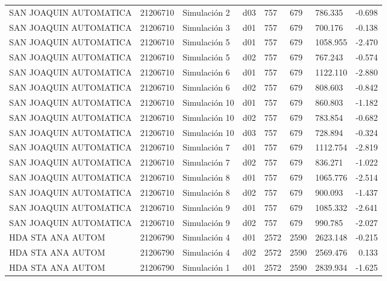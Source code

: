 \begin{landscape}
\begin{longtable}{lrlp{2cm}p{2cm}p{3cm}p{2cm}r}
  SAN JOAQUIN AUTOMATICA &  21206710 &   Simulación 2 &   d03 &       757 &      679 &   786.335 &    -0.698 \\
  SAN JOAQUIN AUTOMATICA &  21206710 &   Simulación 3 &   d01 &       757 &      679 &   700.176 &    -0.138 \\
  SAN JOAQUIN AUTOMATICA &  21206710 &   Simulación 5 &   d01 &       757 &      679 &  1058.955 &    -2.470 \\
  SAN JOAQUIN AUTOMATICA &  21206710 &   Simulación 5 &   d02 &       757 &      679 &   767.243 &    -0.574 \\
  SAN JOAQUIN AUTOMATICA &  21206710 &   Simulación 6 &   d01 &       757 &      679 &  1122.110 &    -2.880 \\
  SAN JOAQUIN AUTOMATICA &  21206710 &   Simulación 6 &   d02 &       757 &      679 &   808.603 &    -0.842 \\
  SAN JOAQUIN AUTOMATICA &  21206710 &  Simulación 10 &   d01 &       757 &      679 &   860.803 &    -1.182 \\
  SAN JOAQUIN AUTOMATICA &  21206710 &  Simulación 10 &   d02 &       757 &      679 &   783.854 &    -0.682 \\
  SAN JOAQUIN AUTOMATICA &  21206710 &  Simulación 10 &   d03 &       757 &      679 &   728.894 &    -0.324 \\
  SAN JOAQUIN AUTOMATICA &  21206710 &   Simulación 7 &   d01 &       757 &      679 &  1112.754 &    -2.819 \\
  SAN JOAQUIN AUTOMATICA &  21206710 &   Simulación 7 &   d02 &       757 &      679 &   836.271 &    -1.022 \\
  SAN JOAQUIN AUTOMATICA &  21206710 &   Simulación 8 &   d01 &       757 &      679 &  1065.776 &    -2.514 \\
  SAN JOAQUIN AUTOMATICA &  21206710 &   Simulación 8 &   d02 &       757 &      679 &   900.093 &    -1.437 \\
  SAN JOAQUIN AUTOMATICA &  21206710 &   Simulación 9 &   d01 &       757 &      679 &  1085.332 &    -2.641 \\
  SAN JOAQUIN AUTOMATICA &  21206710 &   Simulación 9 &   d02 &       757 &      679 &   990.785 &    -2.027 \\
       HDA STA ANA AUTOM &  21206790 &   Simulación 4 &   d01 &      2572 &     2590 &  2623.148 &    -0.215 \\
       HDA STA ANA AUTOM &  21206790 &   Simulación 4 &   d02 &      2572 &     2590 &  2569.476 &     0.133 \\
       HDA STA ANA AUTOM &  21206790 &   Simulación 1 &   d01 &      2572 &     2590 &  2839.934 &    -1.625 \\

\end{longtable}
\end{landscape}

